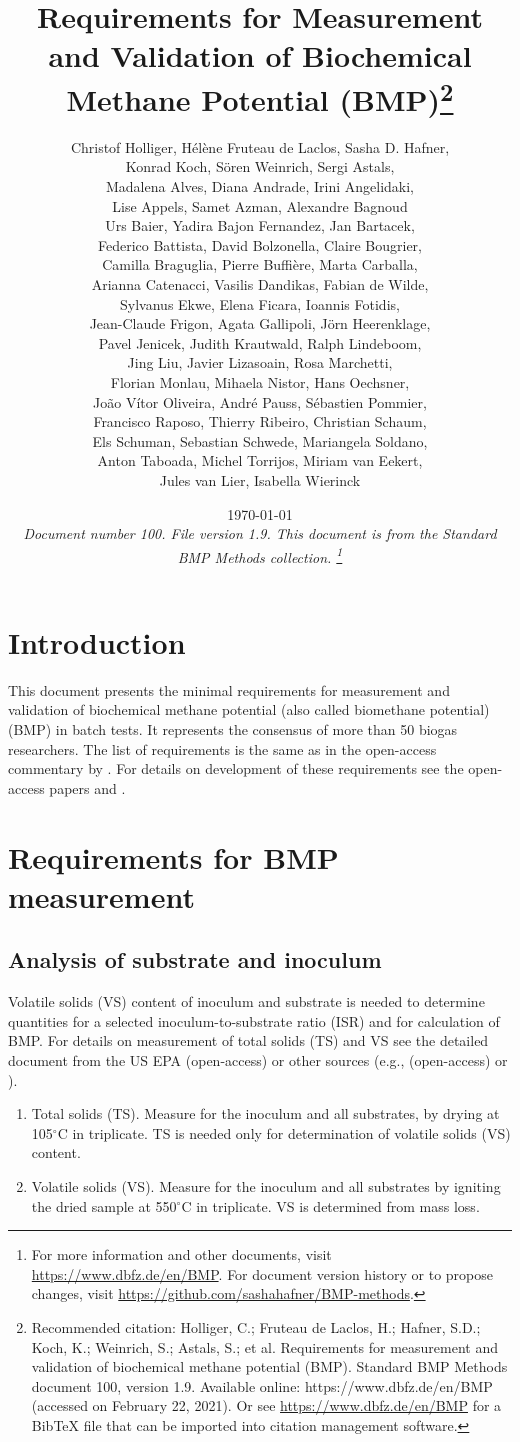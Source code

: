 \documentclass[]{article}
\title {Requirements for Measurement and Validation of Biochemical Methane Potential (BMP)\footnote{
  Recommended citation: 
Holliger, C.; Fruteau de Laclos, H.; Hafner, S.D.; Koch, K.; Weinrich, S.; Astals, S.; et al. Requirements for measurement and validation of biochemical methane potential (BMP). Standard BMP Methods document 100, version 1.9. Available online: https://www.dbfz.de/en/BMP (accessed on February 22, 2021).
\newline
  Or see \url{https://www.dbfz.de/en/BMP} for a BibTeX file that can be imported into citation management software.
}}
\author{
Christof Holliger, 
H{\'e}l{\`e}ne Fruteau de Laclos,
Sasha D. Hafner,\\
Konrad Koch,
S{\"o}ren Weinrich,
Sergi Astals, \\
Madalena Alves, 
Diana Andrade,
Irini Angelidaki,\\
Lise Appels,
Samet Azman,
Alexandre Bagnoud \\
Urs Baier,
Yadira Bajon Fernandez,
Jan Bartacek,\\
Federico Battista,
David Bolzonella,
Claire Bougrier,\\
Camilla Braguglia,
Pierre Buffi{\`e}re,
Marta Carballa,\\
Arianna Catenacci,
Vasilis Dandikas,
Fabian de Wilde,\\
Sylvanus Ekwe,
Elena Ficara,
Ioannis Fotidis,\\
Jean-Claude Frigon,
Agata Gallipoli,
J{\"o}rn Heerenklage,\\
Pavel Jenicek,
Judith Krautwald,
Ralph Lindeboom,\\
Jing Liu,
Javier Lizasoain,
Rosa Marchetti,\\
Florian Monlau,
Mihaela Nistor,
Hans Oechsner,\\
Jo{\~a}o V{\'i}tor Oliveira,
Andr{\'e} Pauss,
S{\'e}bastien Pommier,\\
Francisco Raposo,
Thierry Ribeiro,
Christian Schaum,\\
Els Schuman,
Sebastian Schwede,
Mariangela Soldano,\\
Anton Taboada,
Michel Torrijos,
Miriam van Eekert,\\
Jules van Lier, 
Isabella Wierinck\\
}
\date{\today \\
\bigskip
\textit{
  Document number 100.
  File version 1.9. 
  This document is from the Standard BMP Methods collection.
    \footnote{For more information and other documents, visit \url{https://www.dbfz.de/en/BMP}. 
    For document version history or to propose changes, visit \url{https://github.com/sashahafner/BMP-methods}.}
}
}
\begin{document}
\maketitle

\section{Introduction}
This document presents the minimal requirements for measurement and validation of biochemical methane potential (also called biomethane potential) (BMP) in batch tests.
It represents the consensus of more than 50 biogas researchers.
The list of requirements is the same as in the open-access commentary by \citet{holligerStandardizationBiomethanePotential2021}. 
For details on development of these requirements see the open-access papers \citet{holligerStandardizationBiomethanePotential2016} and \citet{hafnerImprovingInterlaboratoryReproducibility2020}.

\section{Requirements for BMP measurement}
\label{sec:requirements}
\subsection{Analysis of substrate and inoculum}
\label{sec:analysis}
  Volatile solids (VS) content of inoculum and substrate is needed to determine quantities for a selected inoculum-to-substrate ratio (ISR) and for calculation of BMP.
  For details on measurement of total solids (TS) and VS see the detailed document from the US EPA \citep{epaMethod1684Total2001} (open-access) or other sources (e.g., \citet{strachDeterminationTotalSolids2020} (open-access) or \citet{bairdStandardMethodsExamination2017}). 

  \begin{enumerate}
    \item Total solids (TS). Measure for the inoculum and all substrates, by drying at 105$^\circ$C in triplicate. TS is needed only for determination of volatile solids (VS) content.
    \item Volatile solids (VS). Measure for the inoculum and all substrates by igniting the dried sample at 550$^\circ$C in triplicate. VS is determined from mass loss.
  \end{enumerate}
\end{document}
